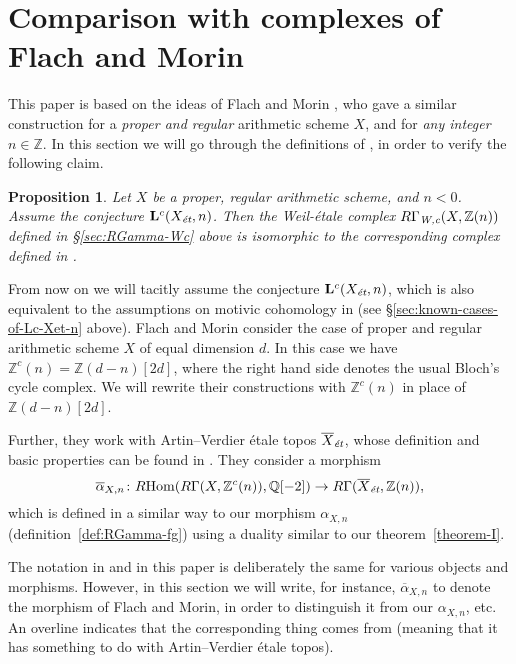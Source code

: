 \documentclass[draft,leqno,12pt]{article}
\theoremstyle{plain}
\newtheorem{proposition}[theorem]{\indent\sc Proposition}
\theoremstyle{definition}
\DeclareMathOperator{\Hom}{Hom}
\newcommand{\ZZ}{\mathbb{Z}}
\newcommand{\QQ}{\mathbb{Q}}
\newcommand{\Wc}{\text{\it W,c}}
\newcommand{\et}{\text{\it \'{e}t}}
\newcommand{\RHom}{R\!\Hom}
\begin{document}

\section{Comparison with complexes of Flach and Morin}
\label{sec:comparison-with-FM}

This paper is based on the ideas of Flach and Morin \cite{Flach-Morin-2018}, who
gave a similar construction for a \emph{proper and regular} arithmetic scheme
$X$, and for \emph{any integer} $n \in \ZZ$. In this section we will go through
the definitions of \cite{Flach-Morin-2018}, in order to verify the following
claim.

\begin{proposition}
  \label{prop:comparison-with-FM}
  Let $X$ be a proper, regular arithmetic scheme, and $n < 0$. Assume the
  conjecture $\mathbf{L}^c (X_\et, n)$. Then the Weil-\'{e}tale complex
  $R\Gamma_\Wc (X, \ZZ(n))$ defined in {\rm \S\ref{sec:RGamma-Wc}} above is isomorphic
  to the corresponding complex defined in {\rm \cite{Flach-Morin-2018}}.
\end{proposition}

From now on we will tacitly assume the conjecture $\mathbf{L}^c (X_\et, n)$,
which is also equivalent to the assumptions on motivic cohomology in
\cite{Flach-Morin-2018} (see \S\ref{sec:known-cases-of-Lc-Xet-n} above). Flach
and Morin consider the case of proper and regular arithmetic scheme $X$ of equal
dimension $d$. In this case we have $\ZZ^c (n) = \ZZ (d-n) [2d]$, where the
right hand side denotes the usual Bloch's cycle complex. We will rewrite their
constructions with $\ZZ^c (n)$ in place of $\ZZ (d-n) [2d]$.

Further, they work with Artin--Verdier \'{e}tale topos $\overline{X}_\et$, whose
definition and basic properties can be found in \cite[\S 6]{Flach-Morin-2018}.
They consider a morphism
\[ \overline{\alpha}_{X,n}\colon \RHom (R\Gamma (X, \ZZ^c (n)), \QQ [-2]) \to
  R\Gamma (\overline{X}_\et, \ZZ (n)), \]
which is defined in a similar way to our morphism $\alpha_{X,n}$
(definition~\ref{def:RGamma-fg}) using a duality similar to our
theorem~\ref{theorem-I}.

The notation in \cite{Flach-Morin-2018} and in this paper is deliberately the
same for various objects and morphisms. However, in this section we will write,
for instance, $\overline{\alpha}_{X,n}$ to denote the morphism of Flach and
Morin, in order to distinguish it from our $\alpha_{X,n}$, etc. An overline
indicates that the corresponding thing comes from \cite{Flach-Morin-2018}
(meaning that it has something to do with Artin--Verdier \'{e}tale topos).
\end{document}

